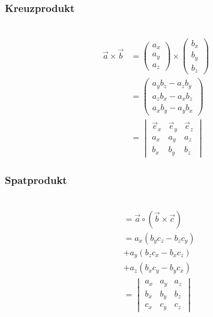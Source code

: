 \begin{multicols}{2}
\subsubsection*{Kreuzprodukt}
\\
\begin{align*} 
\vec{a}\times\vec{b} &= \begin{pmatrix}a_x\\ a_y\\a_z\end{pmatrix}\times\begin{pmatrix}b_x\\ b_y\\b_z\end{pmatrix}\\
&=\begin{pmatrix}a_yb_z-a_zb_y\\ a_zb_x-a_xb_z\\a_xb_y-a_yb_x\end{pmatrix}\\
&=\begin{vmatrix}\vec{e}_x&\vec{e}_y&\vec{e}_z\\a_x&a_y&a_z\\b_x&b_y&b_z\end{vmatrix}
\end{align*}
\vfill
\subsubsection*{Spatprodukt}
\\
\begin{align*} 
[\vec{a}\vec{b}\vec{c}]  &=\vec{a}\circ(\vec{b}\times\vec{c})\\
&=a_x(b_yc_z-b_zc_y)\\&+a_y(b_zc_x-b_xc_z)\\&+a_z(b_xc_y-b_yc_x)\\
&=\begin{vmatrix}a_x&a_y&a_z\\b_x&b_y&b_z\\c_x&c_y&c_z\end{vmatrix}
\end{align*}
\vfill
\end{multicols}

